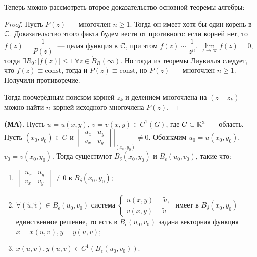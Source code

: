 Теперь можно рассмотреть второе доказательство основной теоремы алгебры:

\begin{proof}
Пусть \(P(z)\)~--- многочлен \(n \ge 1\). Тогда он имеет хотя бы один корень в \(\mathbb{C}\).
Доказательство этого факта будем вести от противного: если корней нет, то \(f(z) = 
\dfrac{1}{P(z)}\)~--- целая функция в \(\mathbb{C}\), при этом \(f(z) \sim \dfrac{1}{z^n}\). \(\lim\limits_
{z \to \infty} f(z) = 0\), тогда \(\exists R_0\colon |f(z)| \le 1 \, \forall z \in \mathring{B}_
R(\infty)\). Но тогда из теоремы Лиувилля следует, что \(f(z) \equiv \mathrm{const}\), тогда и
\(P(z) \equiv \mathrm{const}\), но \(P(z)\)~--- многочлен \(n \ge 1\). Получили противоречие.

Тогда поочерёдным поиском корней \(z_k\) и делением многочлена на \((z - z_k)\) можно найти \(n\) 
корней исходного многочлена \(P(z)\).
\end{proof}



\begin{theorem} \label{29:ma}
\textbf{(МА).} Пусть \(u = u(x, y)\), \(v = v(x, y) \in C^1(G)\), где \(G \subset \mathbb{R}^2\)~---
область. Пусть \((x_0, y_0) \in G\) и \(\left. \begin{vmatrix} u_x & u_y \\ v_x & v_y \end{vmatrix} 
\right|_{(x_0, y_0)} \neq 0\). Обозначим \(u_0 = u(x_0, y_0)\), \(v_0 = v(x_0, y_0)\). Тогда
существуют \(B_\delta (x_0, y_0)\) и \(B_\epsilon (u_0, v_0)\), такие что:
\begin{enumerate}[wide=20pt, itemsep=0ex]
\item \(\begin{vmatrix} u_x & u_y \\ v_x & v_y \end{vmatrix} \ne 0\) в \(B_\delta (x_0, y_0)\); 
\item \(\forall (\tilde{u}, \tilde{v}) \in B_\epsilon (u_0, v_0)\) система \(\begin{cases} u(x, y) =
    \tilde{u}, \\ v(x, y) = \tilde{v} \end{cases}\) имеет в \(B_\delta (x_0, y_0)\) единственное
    решение, то есть в \(B_\epsilon (u_0, v_0)\) задана векторная функция \(x = x(u, v), y = y(u, v)
    \);
\item \(x(u, v), y(u, v) \in C^1(B_\epsilon(u_0, v_0))\).
\end{enumerate}
\end{theorem}

